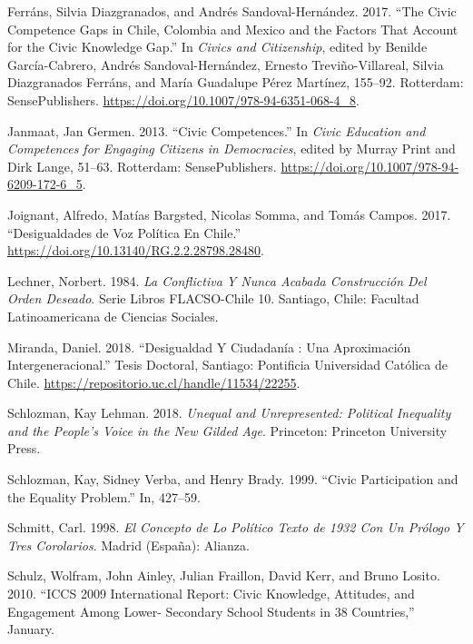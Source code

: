 \documentclass[
]{article}
\begin{document}
\leavevmode\hypertarget{ref-ferransCivicCompetenceGaps2017}{}%
Ferráns, Silvia Diazgranados, and Andrés Sandoval-Hernández. 2017. ``The
Civic Competence Gaps in Chile, Colombia and Mexico and the Factors That
Account for the Civic Knowledge Gap.'' In \emph{Civics and Citizenship},
edited by Benilde García-Cabrero, Andrés Sandoval-Hernández, Ernesto
Treviño-Villareal, Silvia Diazgranados Ferráns, and María Guadalupe
Pérez Martínez, 155--92. Rotterdam: SensePublishers.
\url{https://doi.org/10.1007/978-94-6351-068-4_8}.

\leavevmode\hypertarget{ref-janmaatCivicCompetences2013}{}%
Janmaat, Jan Germen. 2013. ``Civic Competences.'' In \emph{Civic
Education and Competences for Engaging Citizens in Democracies}, edited
by Murray Print and Dirk Lange, 51--63. Rotterdam: SensePublishers.
\url{https://doi.org/10.1007/978-94-6209-172-6_5}.

\leavevmode\hypertarget{ref-joignantDesigualdadesVozPolitica2017}{}%
Joignant, Alfredo, Matías Bargsted, Nicolas Somma, and Tomás Campos.
2017. ``Desigualdades de Voz Política En Chile.''
\url{https://doi.org/10.13140/RG.2.2.28798.28480}.

\leavevmode\hypertarget{ref-lechnerConflictivaNuncaAcabada1984}{}%
Lechner, Norbert. 1984. \emph{La Conflictiva Y Nunca Acabada
Construcción Del Orden Deseado}. Serie Libros FLACSO-Chile 10. Santiago,
Chile: Facultad Latinoamericana de Ciencias Sociales.

\leavevmode\hypertarget{ref-mirandaDesigualdadCiudadaniaAproximacion2018}{}%
Miranda, Daniel. 2018. ``Desigualdad Y Ciudadanía : Una Aproximación
Intergeneracional.'' Tesis Doctoral, Santiago: Pontificia Universidad
Católica de Chile. \url{https://repositorio.uc.cl/handle/11534/22255}.

\leavevmode\hypertarget{ref-schlozmanUnequalUnrepresentedPolitical2018}{}%
Schlozman, Kay Lehman. 2018. \emph{Unequal and Unrepresented: Political
Inequality and the People's Voice in the New Gilded Age}. Princeton:
Princeton University Press.

\leavevmode\hypertarget{ref-Schlozman1999}{}%
Schlozman, Kay, Sidney Verba, and Henry Brady. 1999. ``Civic
Participation and the Equality Problem.'' In, 427--59.

\leavevmode\hypertarget{ref-schmittConceptoPoliticoTexto1998}{}%
Schmitt, Carl. 1998. \emph{El Concepto de Lo Político Texto de 1932 Con
Un Prólogo Y Tres Corolarios}. Madrid (España): Alianza.

\leavevmode\hypertarget{ref-informeiccs2011}{}%
Schulz, Wolfram, John Ainley, Julian Fraillon, David Kerr, and Bruno
Losito. 2010. ``ICCS 2009 International Report: Civic Knowledge,
Attitudes, and Engagement Among Lower- Secondary School Students in 38
Countries,'' January.
\end{document}

